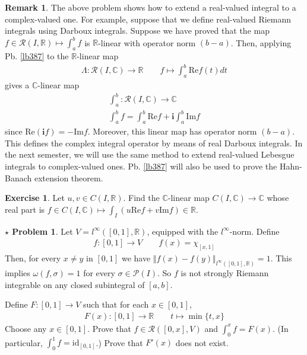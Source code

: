 \documentclass[12pt,b5paper,notitlepage]{article}
\theoremstyle{definition}
\newtheorem{exe}[df]{Exercise}
\newtheorem{rem}[df]{Remark}
\newtheorem{sprob}[prob]{\color{red}$\star$ Problem}
\theoremstyle{plain}
\newcommand{\mc}{\mathcal}
\newcommand{\id}{\mathrm{id}}
\newcommand{\scr}{\mathscr}
\newcommand{\im}{\mathbf{i}}
\newcommand{\Cbb}{\mathbb C}
\newcommand{\Rbb}{\mathbb R}
\newcommand{\Real}{\mathrm{Re}}
\newcommand{\Imag}{\mathrm{Im}}
\numberwithin{equation}{section}
\begin{document}
\begin{rem}
The above problem shows how to extend a real-valued integral to a complex-valued one. For example, suppose that we define real-valued Riemann integrals using Darboux integrals. Suppose we have proved that the map $f\in\scr R(I,\Rbb)\mapsto\int_a^b f$ is $\Rbb$-linear with operator norm $(b-a)$. Then, applying Pb. \ref{lb387} to the $\Rbb$-linear map
\begin{align*}
\Lambda:\scr R(I,\Cbb)\rightarrow \Rbb\qquad f\mapsto \int_a^b \Real f(t)dt
\end{align*}
gives a $\Cbb$-linear map
\begin{gather*}
\int_a^b:\scr R(I,\Cbb)\rightarrow\Cbb\\
\int_a^b f=\int_a^b\Real f+\im\int_a^b\Imag f
\end{gather*}
since $\Real(\im f)=-\Imag f$. Moreover, this linear map has operator norm $(b-a)$. This defines the complex integral operator by means of real Darboux integrals. In the next semester, we will use the same method to extend real-valued Lebesgue integrals to complex-valued ones. Pb. \ref{lb387} will also be used to prove the Hahn-Banach extension theorem.
\end{rem}


\begin{exe}
Let $u,v\in C(I,\Rbb)$. Find the $\Cbb$-linear map $C(I,\Cbb)\rightarrow\Cbb$ whose real part is $f\in C(I,\Cbb)\mapsto \int_I(u\Real f+v\Imag f)\in\Rbb$. 
\end{exe}



\begin{sprob}\label{lb389}
Let $V=l^\infty([0,1],\Rbb)$, equipped with the $l^\infty$-norm. Define 
\begin{align*}
f:[0,1]\rightarrow V\qquad f(x)=\chi_{[x,1]}
\end{align*}
Then, for every $x\neq y$ in $[0,1]$ we have $\Vert f(x)-f(y)\Vert_{l^\infty([0,1],\Rbb)}=1$. This implies $\omega(f,\sigma)=1$ for every $\sigma\in\mc P(I)$. So $f$ is not strongly Riemann integrable on any closed subintegral of $[a,b]$. 

Define $F:[0,1]\rightarrow V$ such that for each $x\in [0,1]$,
\begin{align*}
F(x):[0,1]\rightarrow\Rbb\qquad t\mapsto\min\{t,x\}
\end{align*}
Choose any $x\in[0,1]$. Prove that $f\in\scr R([0,x],V)$ and $\int_0^xf=F(x)$. (In particular, $\int_0^1f=\id_{[0,1]}$.) Prove that $F'(x)$ does not exist.  \hfill\qedsymbol
\end{sprob}
\end{document}
